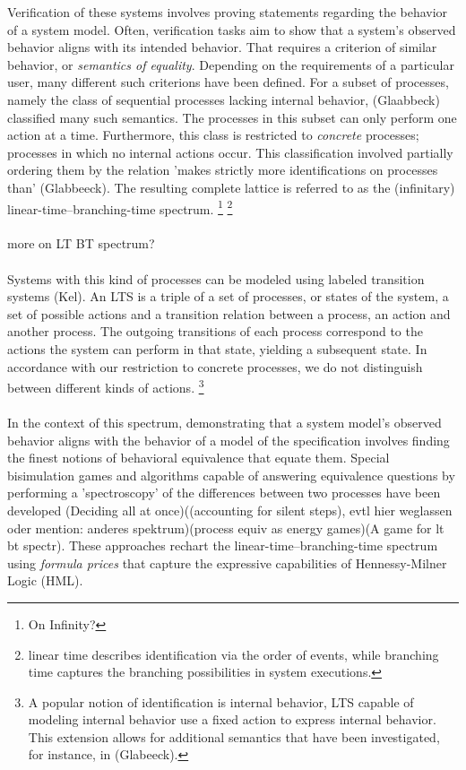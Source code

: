\begin{isabellebody}
\begin{isamarkuptext}
Verification of these systems involves proving statements regarding the behavior of a system model. Often, verification tasks aim to show that a system's observed behavior aligns with its intended behavior.
That requires a criterion of similar behavior, or \textit{semantics of equality}. Depending on the requirements of a particular user, many different such criterions have been defined.
For a subset of processes, namely the class of sequential processes lacking internal behavior, (Glaabbeck) classified many such semantics. 
The processes in this subset can only perform one action at a time. Furthermore, this class is restricted to \textit{concrete} processes; processes in which no internal actions occur.
This classification involved partially ordering them by the relation 'makes strictly more identifications on processes than' (Glabbeeck). The resulting complete lattice is
referred to as the (infinitary) linear-time--branching-time spectrum. \footnote{On Infinity?} 
\footnote{linear time describes identification via the order of events, while branching time captures the branching possibilities in system executions.}
\\\\
more on LT BT spectrum?
\\\\
Systems with this kind of processes can be modeled using labeled transition systems (Kel). An LTS is a triple of a set of processes, or states of the system,
a set of possible actions and a transition relation between a process, an action and another process. The outgoing transitions of each process correspond to the actions the system can perform in that state, 
yielding a subsequent state. In accordance with our restriction to concrete processes, we do not distinguish between different kinds of actions. 
\footnote{A popular notion of identification is internal behavior, LTS capable of modeling internal behavior use a fixed action to express internal behavior. This extension allows for additional semantics that have been investigated, for instance, in (Glabeeck).}
\\\\
In the context of this spectrum, demonstrating that a system model's observed behavior aligns with the behavior of a model of the specification involves 
finding the finest notions of behavioral equivalence that equate them. Special bisimulation games and algorithms capable of answering equivalence questions 
by performing a 'spectroscopy' of the differences between two processes have been developed (Deciding all at once)((accounting for silent steps), evtl hier weglassen oder mention: anderes spektrum)(process equiv as energy games)(A game for lt bt spectr).
These approaches rechart the linear-time--branching-time spectrum using \textit{formula prices} that capture the expressive capabilities of Hennessy-Milner Logic (HML).


\end{isamarkuptext}
\end{isabellebody}
